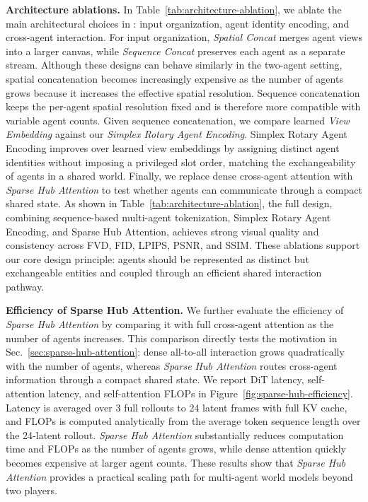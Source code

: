 \noindent\textbf{Architecture ablations.}
In Table~\ref{tab:architecture-ablation}, we ablate the main architectural choices in \ours: input organization, agent identity encoding, and cross-agent interaction.
For input organization, \emph{Spatial Concat} merges agent views into a larger canvas, while \emph{Sequence Concat} preserves each agent as a separate stream.
Although these designs can behave similarly in the two-agent setting, spatial concatenation becomes increasingly expensive as the number of agents grows because it increases the effective spatial resolution.
Sequence concatenation keeps the per-agent spatial resolution fixed and is therefore more compatible with variable agent counts.
Given sequence concatenation, we compare learned \emph{View Embedding} against our \emph{Simplex Rotary Agent Encoding}.
Simplex Rotary Agent Encoding improves over learned view embeddings by assigning distinct agent identities without imposing a privileged slot order, matching the exchangeability of agents in a shared world.
Finally, we replace dense cross-agent attention with \emph{Sparse Hub Attention} to test whether agents can communicate through a compact shared state.
As shown in Table~\ref{tab:architecture-ablation}, the full design, combining sequence-based multi-agent tokenization, Simplex Rotary Agent Encoding, and Sparse Hub Attention, achieves strong visual quality and consistency across FVD, FID, LPIPS, PSNR, and SSIM.
These ablations support our core design principle: agents should be represented as distinct but exchangeable entities and coupled through an efficient shared interaction pathway.



\noindent\textbf{Efficiency of Sparse Hub Attention.}
We further evaluate the efficiency of \emph{Sparse Hub Attention} by comparing it with full cross-agent attention as the number of agents increases.
This comparison directly tests the motivation in Sec.~\ref{sec:sparse-hub-attention}: dense all-to-all interaction grows quadratically with the number of agents, whereas \emph{Sparse Hub Attention} routes cross-agent information through a compact shared state.
We report DiT latency, self-attention latency, and self-attention FLOPs in Figure~\ref{fig:sparse-hub-efficiency}. Latency is averaged over 3 full rollouts to 24 latent frames with full KV cache, and FLOPs is computed analytically from the average token sequence length over the 24-latent rollout.
\emph{Sparse Hub Attention} substantially reduces computation time and FLOPs as the number of agents grows, while dense attention quickly becomes expensive at larger agent counts.
These results show that \emph{Sparse Hub Attention} provides a practical scaling path for multi-agent world models beyond two players.



